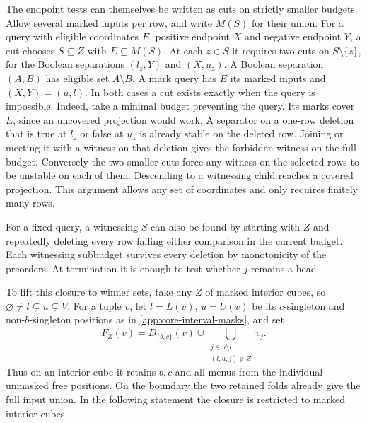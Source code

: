 The endpoint tests can themselves be written as cuts on strictly
smaller budgets. Allow several marked inputs per row, and write
$M(S)$ for their union. For a query with eligible coordinates $E$,
positive endpoint $X$ and negative endpoint $Y$, a cut chooses
$S\subseteq Z$ with $E\subseteq M(S)$. At each $z\in S$ it requires
two cuts on $S\setminus\{z\}$, for the Boolean separations
$(l_z,Y)$ and $(X,u_z)$. A Boolean separation $(A,B)$ has eligible
set $A\setminus B$. A mark query has $E$ its marked inputs and
$(X,Y)=(u,l)$. In both cases a cut exists exactly when the query
is impossible. Indeed, take a minimal budget preventing the query.
Its marks cover $E$, since an uncovered projection would work.
A separator on a one-row deletion that is true at $l_z$ or false
at $u_z$ is already stable on the deleted row. Joining or meeting
it with a witness on that deletion gives the forbidden witness on
the full budget. Conversely the two smaller cuts force any witness
on the selected rows to be unstable on each of them. Descending
to a witnessing child reaches a covered projection. This argument
allows any set of coordinates and only requires finitely many rows.

For a fixed query, a witnessing $S$ can also be found by starting
with $Z$ and repeatedly deleting every row failing either comparison
in the current budget. Each witnessing subbudget survives every
deletion by monotonicity of the preorders. At termination it is
enough to test whether $j$ remains a head.

To lift this closure to winner sets, take any $Z$ of marked interior
cubes, so $\varnothing\ne l\subsetneq u\subsetneq V$. For a tuple
$v$, let $l=L(v)$, $u=U(v)$ be its $c$-singleton and non-$b$-singleton
positions as in \cref{app:core-interval-masks}, and set
\[
 F_Z(v)=D_{\{b,c\}}(v)\cup
   \bigcup_{\substack{j\in u\setminus l\\(l,u,j)\notin Z}}v_j .
\]
Thus on an interior cube it retains $b,c$ and all menus from the
individual unmasked free positions. On the boundary the two retained
folds already give the full input union. In the following statement
the closure is restricted to marked interior cubes.

